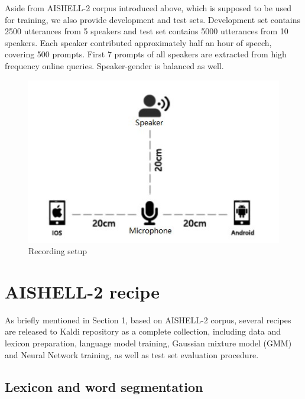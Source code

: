 \documentclass[a4paper]{article}
\begin{document}
\noindent Aside from AISHELL-2 corpus introduced above, which is supposed to be used for training, 
we also provide development and test sets. 
Development set contains 2500 utterances from 5 speakers and test set contains 5000 utterances from 10 speakers. 
Each speaker contributed approximately half an hour of speech, covering 500 prompts. 
First 7 prompts of all speakers are extracted from high frequency online queries. Speaker-gender is balanced as well.

\begin{figure}[h]
  \centering
  \includegraphics[width=\linewidth]{setup.jpg}
  \caption{Recording setup}
  \label{fig:setup}
\end{figure}

\section{AISHELL-2 recipe}

As briefly mentioned in Section 1, based on AISHELL-2 corpus, several recipes are released to Kaldi repository as a complete collection, including data and lexicon preparation, language model training, Gaussian mixture model (GMM) and Neural Network training, as well as test set evaluation procedure.

\subsection{Lexicon and word segmentation}
\end{document}
